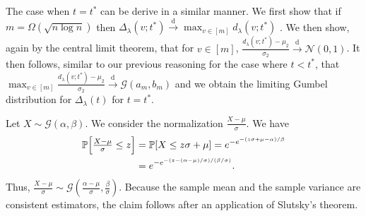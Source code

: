 \documentclass[10pt,journal,compsoc]{IEEEtran}
\theoremstyle{definition}
\begin{document}
\begin{IEEEproof}[Proposition~5]
  The case when $t = t^{*}$ can be derive in a similar manner. We
  first show that if $m = \Omega(\sqrt{n \log n})$ then
  $\Delta_{\lambda}(v;t^{*}) \overset{\mathrm{d}}{\longrightarrow}
  \max_{v \in [m]}{d_{\lambda}(v;t^{*})}$ \cite[Lemma
  3.1]{rukhin:_limit_distr_graph_scan_statis}. We then show, again by
  the central limit theorem, that for $v \in [m]$,
  $\tfrac{d_{\lambda}(v;t^{*}) - \mu_2}{\sigma_2}
  \overset{\mathrm{d}}{\longrightarrow} \mathcal{N}(0,1)$. It then
  follows, similar to our previous reasoning for the case where $t <
  t^{*}$, that $\max_{v \in [m]} \tfrac{d_{\lambda}(v;t^{*}) -
    \mu_2}{\sigma_2}
  \overset{\mathrm{d}}{\longrightarrow}\mathcal{G}(a_m,b_m)$ and we
  obtain the limiting Gumbel distribution for $\Delta_{\lambda}(t)$ for $t = t^{*}$.
\end{IEEEproof}
\begin{IEEEproof}[Theorem~6]
  Let $ X \sim \mathcal{G}(\alpha, \beta)$. We consider the
  normalization $\tfrac{X - \mu}{\sigma}$. We have
  \begin{equation*}
    \begin{split}
    \mathbb{P}\Bigl[ \tfrac{X - \mu}{\sigma} \leq z\Bigr]  &= \mathbb{P}[X \leq z
    \sigma + \mu] 
    = e^{-e^{-(z \sigma + \mu - \alpha)/\beta}} \\
      &= e^{- e^{-(z - (\alpha - \mu)/\sigma)/(\beta/\sigma)}}.
    \end{split}
  \end{equation*}
  Thus, $\tfrac{X - \mu}{\sigma} \sim \mathcal{G}(\tfrac{\alpha -
    \mu}{\sigma}, \tfrac{\beta}{\sigma})$. Because the sample
  mean and the sample variance are consistent estimators, the claim
  follows after an application of Slutsky's theorem.
\end{IEEEproof}
\end{document}
